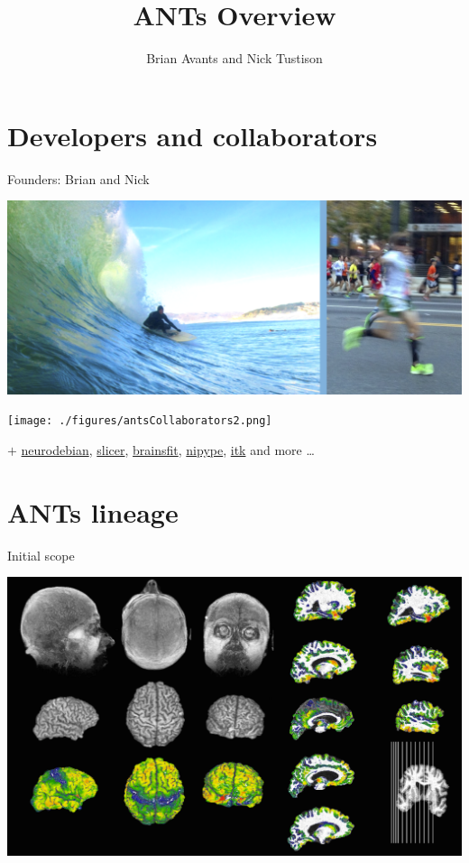 \documentclass[ignorenonframetext,]{beamer}
\institute{University of Virginia}
\title{ANTs Overview}
\author{Brian Avants and Nick Tustison}
\date{}
\begin{document}
\frame{\titlepage}

\section{Developers and
collaborators}\label{developers-and-collaborators}

\begin{frame}{Founders: Brian and Nick}

\includegraphics{./figures/brian_and_nick.png}

\end{frame}

\begin{frame}

\texttt{[image: ./figures/antsCollaborators2.png]}

\(+\) \href{http://neuro.debian.net/pkgs/ants.html}{neurodebian},
\href{http://www.slicer.org/}{slicer},
\href{https://github.com/BRAINSia/BRAINSTools}{brainsfit},
\href{http://nipy.sourceforge.net/nipype/}{nipype},
\href{http://www.itk.org}{itk} and more \ldots{}

\end{frame}

\section{ANTs lineage}\label{ants-lineage}

\begin{frame}{Initial scope}

\includegraphics{./figures/ants_initial_scope.png}

\end{frame}
\end{document}
